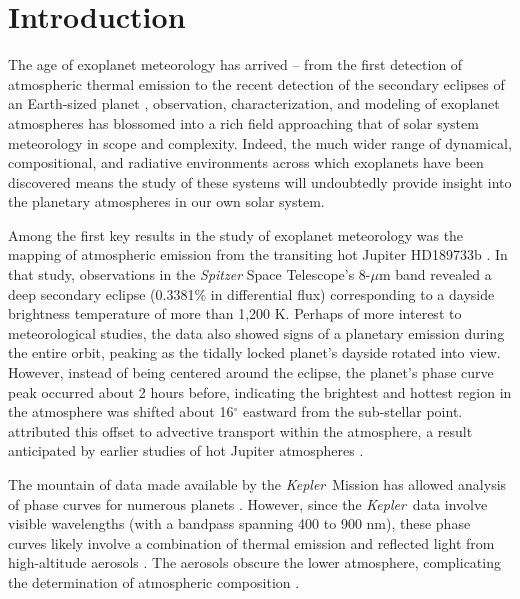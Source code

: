 \documentclass[manuscript]{aastex62}
\newcommand{\kepler}{{\it Kepler}}
\begin{document}





\section{Introduction}
\label{sec:Introduction}
The age of exoplanet meteorology has arrived -- from the first detection of atmospheric thermal emission \citep{2005Natur.434..740D, 2005ApJ...626..523C} to the recent detection of the secondary eclipses of an Earth-sized planet \citep{2016Natur.532..207D}, observation, characterization, and modeling of exoplanet atmospheres has blossomed into a rich field approaching that of solar system meteorology in scope and complexity. Indeed, the much wider range of dynamical, compositional, and radiative environments across which exoplanets have been discovered means the study of these systems will undoubtedly provide insight into the planetary atmospheres in our own solar system.

Among the first key results in the study of exoplanet meteorology was the mapping of atmospheric emission from the transiting hot Jupiter HD189733b \citep{2007Natur.447..183K}. In that study, observations in the \emph{Spitzer} Space Telescope's 8-$\mu$m band revealed a deep secondary eclipse (0.3381\% in differential flux) corresponding to a dayside brightness temperature of more than 1,200 K. Perhaps of more interest to meteorological studies, the data also showed signs of a planetary emission during the entire orbit, peaking as the tidally locked planet's dayside rotated into view. However, instead of being centered around the eclipse, the planet's phase curve peak occurred about 2 hours before, indicating the brightest and hottest region in the atmosphere was shifted about 16$^\circ$ eastward from the sub-stellar point. \citet{2007Natur.447..183K} attributed this offset to advective transport within the atmosphere, a result anticipated by earlier studies of hot Jupiter atmospheres \citep[e.g.,][]{2002A&A...385..166S}. 

The mountain of data made available by the \kepler\ Mission has allowed analysis of phase curves for numerous planets \citep[e.g.,][]{2015ApJ...804..150E}. However, since the \kepler\ data involve visible wavelengths (with a bandpass spanning 400 to 900 nm), these phase curves likely involve a combination of thermal emission and reflected light from high-altitude aerosols \citep{2000ApJ...538..885S}. The aerosols obscure the lower atmosphere, complicating the determination of atmospheric composition \citep{2016Natur.529...59S}. 
\end{document}
